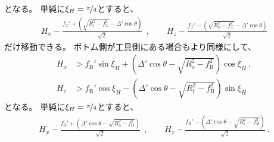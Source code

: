 となる。
単純に$\xi_H = \nicefrac\pi4$とすると、
\begin{align*}
  H_x-\frac{f_\mathrm T'+\left(\sqrt{R_\mathrm i^2-f_\mathrm T^2}-\varDelta'\cos\theta\right)}{\sqrt2}~~,\qquad
  H_z-\frac{f_\mathrm T'-\left(\sqrt{R_\mathrm o^2-f_\mathrm T^2}-\varDelta'\cos\theta\right)}{\sqrt2}
\end{align*}
だけ移動できる。
ボトム側が工具側にある場合もより同様にして、
\begin{align*}
  H_x &> f_\mathrm B'\sin\xi_H+\left(\varDelta'\cos\theta-\sqrt{R_\mathrm o^2-f_\mathrm B^2}\right)\!\cos\xi_H\ ,\\
  H_z &> f_\mathrm B'\cos\xi_H-\left(\varDelta'\cos\theta-\sqrt{R_\mathrm i^2-f_\mathrm B^2}\right)\!\sin\xi_H
\end{align*}
となる。
単純に$\xi_H = \nicefrac\pi4$とすると、
\begin{align*}
  H_x-\frac{f_\mathrm B'+\left(\varDelta'\cos\theta-\sqrt{R_\mathrm o^2-f_\mathrm B^2}\right)}{\sqrt2}~~,\qquad
  H_z-\frac{f_\mathrm B'-\left(\varDelta'\cos\theta-\sqrt{R_\mathrm i^2-f_\mathrm B^2}\right)}{\sqrt2}\ .
\end{align*}







